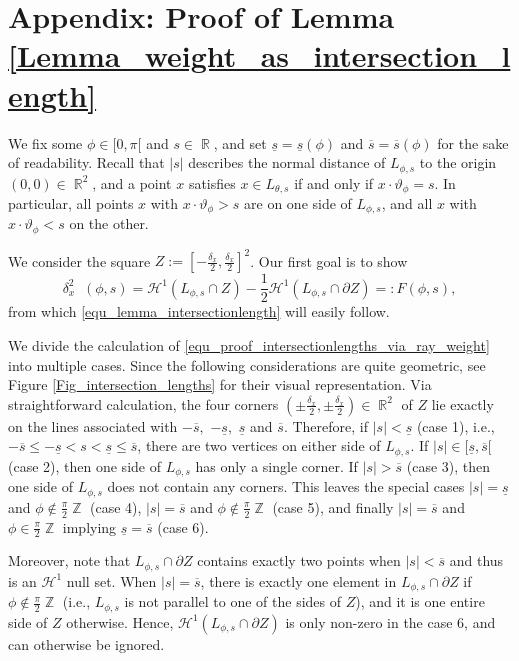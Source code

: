 \documentclass[11pt,reqno]{amsart}
\DeclareMathOperator{\RR}{\mathbb{R}}
\DeclareMathOperator{\ZZ}{\mathbb{Z}}
\DeclareMathOperator{\RayWeight}{\omega^\mathrm{rd}_{\delta_\mathit{x}}}
\numberwithin{theorem}{section}
\theoremstyle{remark}
\begin{document}
\appendix

\section*{Appendix: Proof of Lemma \ref{Lemma_weight_as_intersection_length}}
We fix some $\phi \in [0,\pi[$ and $s\in \RR$, and set $\underline s = \underline s(\phi)$ and $\overline s = \overline s(\phi)$ for the sake of readability. 
Recall that $|s|$ describes the normal distance of $L_{\phi,s}$ to the origin $(0,0)\in \RR^2$, and a point $x$ satisfies $x\in L_{\theta,s}$  if and only if $x\cdot \vartheta_\phi=s$. In particular, all points $x$ with $x\cdot \vartheta_\phi>s$ are on one side of $L_{\phi,s}$, and all $x$ with $x\cdot \vartheta_\phi<s$ on the other.

We consider the square $Z :=\left[-\frac{\delta_x}{2},\frac{\delta_x}{2} \right ]^2$. Our first goal is to show
\begin{equation} \label{equ_proof_intersectionlengths_via_ray_weight}
\delta_x^2\RayWeight(\phi,s)=\mathcal{H}^1(L_{\phi,s}\cap Z)-\frac{1}{2}\mathcal{H}^1(L_{\phi,s}\cap \partial Z)=:F(\phi,s),
\end{equation}
from which \eqref{equ_lemma_intersectionlength} will easily follow.

We divide the calculation of \eqref{equ_proof_intersectionlengths_via_ray_weight} into multiple cases. Since the following considerations are quite geometric, see Figure \ref{Fig_intersection_lengths} for their visual representation.
Via straightforward calculation, the four corners $(\pm \frac{\delta_x}{2},\pm \frac{\delta_x}{2})\in \RR^2$ of $Z$ lie exactly on the lines associated with $-\overline s,$ $-\underline s,$ $\underline s$ and $\overline s$.
Therefore, if $|s|< \underline s$ (case 1), i.e., $-\overline s\leq - \underline s <s<\underline s\leq \overline s$, there are two vertices on either side of $L_{\phi,s}$. If $|s|\in [\underline s,\overline s[$ (case 2), then one side of $L_{\phi,s}$ has only a single corner. If $|s|>\overline s$ (case 3), then one side of $L_{\phi,s}$ does not contain any corners. This leaves the special cases $|s|=\underline s$ and $\phi \not \in \frac{\pi}{2}\ZZ$ (case 4), $|s|=\overline s$  and $\phi \not \in \frac{\pi}{2}\ZZ$ (case 5), and finally  $|s|=\overline s$ and $\phi \in \frac{\pi}{2}\ZZ$  implying $\underline s = \overline s$ (case 6).

Moreover, note that $L_{\phi,s}\cap \partial Z$ contains exactly two points when $|s|<\overline s$ and thus is an $\mathcal{H}^1$ null set. When $|s|=\overline s$, there is exactly one element in $L_{\phi,s}\cap \partial Z$ if $\phi \not \in \frac{\pi}{2}\ZZ$ (i.e., $L_{\phi,s}$ is not parallel to one of the sides of $Z$), and it is one entire side of $Z$ otherwise. Hence, $\mathcal{H}^1(L_{\phi,s}\cap \partial Z)$ is only non-zero in the case 6, and can otherwise be ignored.
\end{document}

